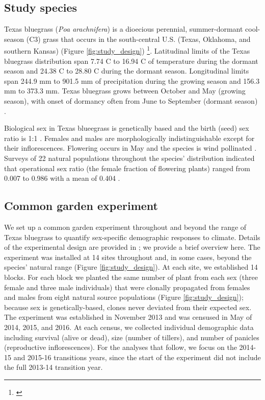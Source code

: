 \documentclass[12pt]{article}
\newcommand{\jacob}[2]{{\color{blue}{#1}}\footnote{\textit{\color{blue}{#2}}}}
\begin{document}
\subsection*{Study species}
Texas bluegrass (\textit{Poa arachnifera}) is a dioecious perennial, summer-dormant cool-season (C3) grass that occurs in the south-central U.S. (Texas, Oklahoma, and southern Kansas) (Figure \ref{fig:study_design}) \citep{hitchcock1971manual}\jacob{}{I have updated the map}. 
Latitudinal limits of the Texas bluegrass distribution span 7.74 \degree C to 16.94 \degree C of temperature during the dormant season and 24.38 \degree C to 28.80 \degree C  during the dormant season. 
Longitudinal limits span 244.9 mm to 901.5 mm of precipitation during the growing season and 156.3 mm to 373.3 mm. 
Texas bluegrass grows between October and May (growing season), with onset of dormancy often from June to September (dormant season) \citep{kindiger2004interspecific}. 

Biological sex in Texas blueegrass is genetically based and the birth (seed) sex ratio is 1:1 \citep{renganayaki2005identification}. 
Females and males are morphologically indistinguishable except for their inflorescences. 
Flowering occurs in May and the species is wind pollinated \citep{hitchcock1971manual}. 
Surveys of 22 natural populations throughout the species' distribution indicated that operational sex ratio (the female fraction of flowering plants) ranged from 0.007 to 0.986 with a mean of 0.404 \citep{miller2022two}. 

\subsection*{Common garden experiment}
We set up a common garden experiment throughout and beyond the range of Texas bluegrass to quantify sex-specific demographic responses to climate. 
Details of the experimental design are provided in \cite{miller2022two}; we provide a brief overview here. 
The experiment was installed at 14 sites throughout and, in some cases, beyond the species' natural range (Figure \ref{fig:study_design}).
At each site, we established 14 blocks. 
For each block we planted the same number of plant from each sex (three female and three male individuals) that were clonally propagated from females and males from eight natural source populations (Figure \ref{fig:study_design}); because sex is genetically-based, clones never deviated from their expected sex. 
The experiment was established in November 2013 and was censused in May of 2014, 2015, and 2016. 
At each census, we collected individual demographic data including survival (alive or dead), size (number of tillers), and number of panicles (reproductive inflorescences). 
For the analyses that follow, we focus on the 2014-15 and 2015-16 transitions years, since the start of the experiment did not include the full 2013-14 transition year.
\end{document}
